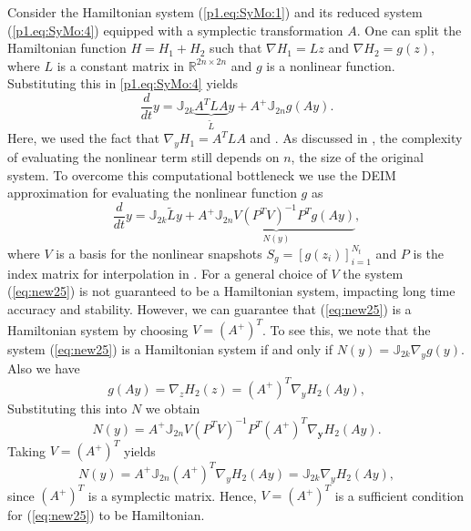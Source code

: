 Consider the Hamiltonian system (\ref{p1.eq:SyMo:1}) and its reduced system (\ref{p1.eq:SyMo:4}) equipped with a symplectic transformation $A$. One can split the Hamiltonian function $H = H_1 + H_2$ such that $\nabla H_1 = L z$ and $\nabla H_2 = g(z)$, where $L$ is a constant matrix in $\mathbb R^{2n\times 2n}$ and $g$ is a nonlinear function. Substituting this in \cref{p1.eq:SyMo:4} yields
\begin{equation} \label{eq:new24}
	\frac{d}{dt} y = \mathbb J_{2k}\underbrace{ A^T L A}_{\tilde L} y + A^+ \mathbb J_{2n} g(Ay).
\end{equation}
Here, we used the fact that $\nabla_y H_1 = A^TLA$ and . As discussed in , the complexity of evaluating the nonlinear term still depends on $n$, the size of the original system. To overcome this computational bottleneck we use the DEIM approximation for evaluating the nonlinear function $g$ as
\begin{equation} \label{eq:new25}
	\frac{d}{dt} y = \mathbb J_{2k} \tilde L y + \underbrace{ A^+ \mathbb J_{2n} V (P^TV)^{-1} P^T g(Ay) }_{N( y)},
\end{equation}
where $V$ is a basis for the nonlinear snapshots $S_{g} = [g(z_i)]_{i=1}^{N_t}$ and $P$ is the index matrix for interpolation in . For a general choice of $V$ the system (\ref{eq:new25}) is not guaranteed to be a Hamiltonian system, impacting long time accuracy and stability. However, we can guarantee that (\ref{eq:new25}) is a Hamiltonian system by choosing $V=(A^+)^T$. To see this, we note that the system (\ref{eq:new25}) is a Hamiltonian system if and only if $N(y) = \mathbb J_{2k} \nabla_{y} g(y)$. Also we have 
\begin{equation} \label{eq:new26}
	g(Ay) = \nabla_{z} H_2(z) = (A^+)^T \nabla_{y} H_2(Ay),
\end{equation}
Substituting this into $N$ we obtain
\begin{equation} \label{eq:new27}
	N(y)= A^+ \mathbb J_{2n} V (P^TV)^{-1} P^T  (A^+)^T \nabla_{\mathbf y} H_2(Ay).
\end{equation}
Taking $V = (A^+)^T$ yields
\begin{equation} \label{eq:new28}
	N(y) = A^+ \mathbb J_{2n}(A^+)^T \nabla_{y} H_2(Ay) = \mathbb J_{2k} \nabla_{y} H_2(A y),
\end{equation}
since $(A^+)^T$ is a symplectic matrix. Hence, $V = (A^+)^T$ is a sufficient condition for (\ref{eq:new25}) to be Hamiltonian. 

